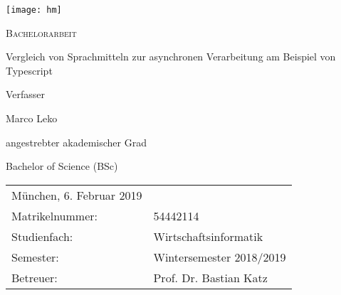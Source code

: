 \begin{titlepage}
\begin{minipage}{0.9\linewidth}
\begin{center}
\centering 
	      		 
\texttt{[image: hm]}
	
\begin{center}
\huge{\textsc{\scshape{ Bachelorarbeit}}}
\end{center}

\vspace{1cm}
{\scshape{\Large Vergleich von Sprachmitteln zur asynchronen Verarbeitung am Beispiel von Typescript\par}}
\vspace{1cm}
    
  
Verfasser  \linebreak
 {\Large Marco Leko\par}
 	\vspace{1.5cm}
angestrebter akademischer Grad\linebreak
 {\Large Bachelor of Science (BSc)\par}
	\vspace{1cm}

\flushleft
\begin{tabular}{ll}
München, 6. Februar 2019\linebreak

\vspace{1cm}&   \\
  Matrikelnummer: & 54442114 \vspace{0.3cm} \\ 
  Studienfach: & Wirtschaftsinformatik \vspace{0.3cm} \\
  Semester: & Wintersemester 2018/2019 \vspace{0.3cm} \\ 
  Betreuer: & Prof. Dr. Bastian Katz \\
 \end{tabular}

\end{center}
\end{minipage}
\end{titlepage}